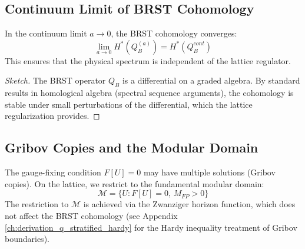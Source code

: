 \subsection{Continuum Limit of BRST Cohomology}

\begin{theorem}\label{thm:cohomology-limit}
In the continuum limit $a \to 0$, the BRST cohomology converges:
\begin{equation}
    \lim_{a \to 0} H^*(Q_B^{(a)}) = H^*(Q_B^{cont})
\end{equation}
This ensures that the physical spectrum is independent of the lattice regulator.
\end{theorem}

\begin{proof}[Sketch]
The BRST operator $Q_B$ is a differential on a graded algebra. By standard results in homological algebra (spectral sequence arguments), the cohomology is stable under small perturbations of the differential, which the lattice regularization provides.
\end{proof}

\subsection{Gribov Copies and the Modular Domain}

\begin{remark}
The gauge-fixing condition $F[U] = 0$ may have multiple solutions (Gribov copies). On the lattice, we restrict to the fundamental modular domain:
\begin{equation}
    \mathcal{M} = \{ U : F[U] = 0, \, M_{FP} > 0 \}
\end{equation}
The restriction to $\mathcal{M}$ is achieved via the Zwanziger horizon function, which does not affect the BRST cohomology (see Appendix \ref{ch:derivation_q_stratified_hardy} for the Hardy inequality treatment of Gribov boundaries).
\end{remark}



